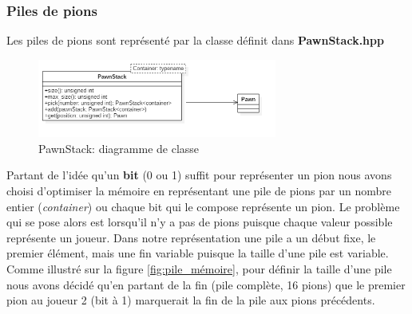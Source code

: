\documentclass[article, backcover, french, nodocumentinfo]{upmethodology-document}
\begin{document}
			\subsubsection{Piles de pions}
					Les piles de pions sont représenté par la classe  définit dans \textbf{PawnStack.hpp}
					\begin{figure}[H]
						\centering
						\includegraphics[width=0.7\textwidth]{figures/PawnStackDiagram}
						\caption{PawnStack: diagramme de classe}
						\label{fig:PawnStackDiagram}
					\end{figure}
					Partant de l'idée qu'un \textbf{bit} (0 ou 1) suffit pour représenter un pion nous avons choisi d'optimiser la mémoire en représentant une pile de pions par un nombre entier (\textit{container}) ou chaque bit qui le compose représente un pion. Le problème qui se pose alors est lorsqu'il n'y a pas de pions puisque chaque valeur possible représente un joueur.
					Dans notre représentation une pile a un début fixe, le premier élément, mais une fin variable puisque la taille d'une pile est variable. Comme illustré sur la figure \ref{fig:pile_mémoire}, pour définir la taille d'une pile nous avons décidé qu'en partant de la fin (pile complète, 16 pions) que le premier pion au joueur 2 (bit à 1) marquerait la fin de la pile aux pions précédents.
\end{document}
